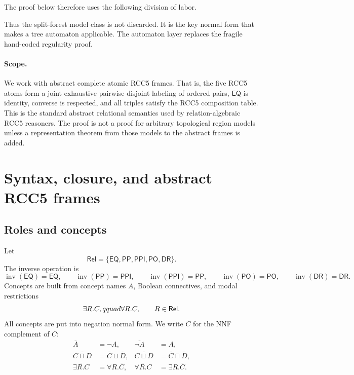 \documentclass[11pt]{article}
\newcommand{\Rel}{\mathsf{Rel}}
\newcommand{\EQ}{\mathsf{EQ}}
\newcommand{\PP}{\mathsf{PP}}
\newcommand{\PPI}{\mathsf{PPI}}
\newcommand{\PO}{\mathsf{PO}}
\newcommand{\DR}{\mathsf{DR}}
\newcommand{\Inv}{\operatorname{inv}}
\begin{document}
The proof below therefore uses the following division of labor.
\begin{center}
\end{center}

Thus the split-forest model class is not discarded.  It is the key normal form that makes a tree automaton applicable.  The automaton layer replaces the fragile hand-coded regularity proof.

\paragraph{Scope.}
We work with abstract complete atomic RCC5 frames.  That is, the five RCC5 atoms form a joint exhaustive pairwise-disjoint labeling of ordered pairs, $\EQ$ is identity, converse is respected, and all triples satisfy the RCC5 composition table.  This is the standard abstract relational semantics used by relation-algebraic RCC5 reasoners.  The proof is not a proof for arbitrary topological region models unless a representation theorem from those models to the abstract frames is added.

\section{Syntax, closure, and abstract RCC5 frames}

\subsection{Roles and concepts}

Let
\[
  \Rel=\{\EQ,\PP,\PPI,\PO,\DR\}.
\]
The inverse operation is
\[
\Inv(\EQ)=\EQ,
\qquad
\Inv(\PP)=\PPI,
\qquad
\Inv(\PPI)=\PP,
\qquad
\Inv(\PO)=\PO,
\qquad
\Inv(\DR)=\DR.
\]
Concepts are built from concept names $A$, Boolean connectives, and modal restrictions
\[
  \exists R.C,\\qquad \forall R.C,
  \qquad R\in\Rel.
\]
All concepts are put into negation normal form.  We write $\overline C$ for the NNF complement of $C$:
\begin{align*}
\overline{A}&=\neg A,& \overline{\neg A}&=A,\\
\overline{C\sqcap D}&=\overline C\sqcup\overline D,&
\overline{C\sqcup D}&=\overline C\sqcap\overline D,\\
\overline{\exists R.C}&=\forall R.\overline C,&
\overline{\forall R.C}&=\exists R.\overline C.
\end{align*}
\end{document}
